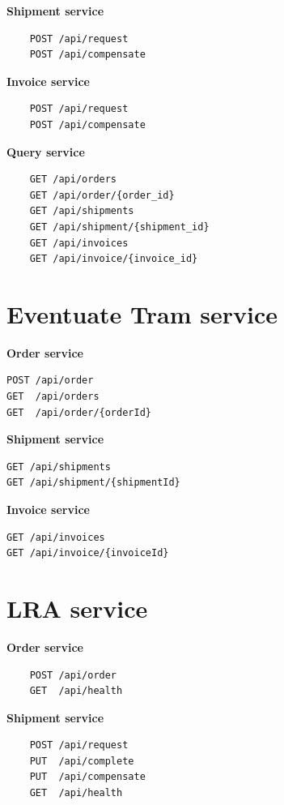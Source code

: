 \documentclass[oneside,
  digital, %
  table,   %
  lof,     %
  lot,     %
]{fithesis3}
\begin{document}
\noindent
\textbf{Shipment service}

\begin{verbatim}
    POST /api/request
    POST /api/compensate
\end{verbatim}

\noindent
\textbf{Invoice service}

\begin{verbatim}
    POST /api/request
    POST /api/compensate
\end{verbatim}

\noindent
\textbf{Query service}

\begin{verbatim}
    GET /api/orders
    GET /api/order/{order_id}
    GET /api/shipments
    GET /api/shipment/{shipment_id}
    GET /api/invoices
    GET /api/invoice/{invoice_id}
\end{verbatim}

\section{Eventuate Tram service}

\textbf{Order service}

\begin{verbatim}
POST /api/order
GET  /api/orders
GET  /api/order/{orderId}
\end{verbatim}

\noindent
\textbf{Shipment service}

\begin{verbatim}
GET /api/shipments
GET /api/shipment/{shipmentId}
\end{verbatim}

\noindent
\textbf{Invoice service}

\begin{verbatim}
GET /api/invoices
GET /api/invoice/{invoiceId}
\end{verbatim}

\section{LRA service}

\textbf{Order service}

\begin{verbatim}
    POST /api/order
    GET  /api/health
\end{verbatim}

\noindent
\textbf{Shipment service}

\begin{verbatim}
    POST /api/request
    PUT  /api/complete
    PUT  /api/compensate
    GET  /api/health
\end{verbatim}
\end{document}

